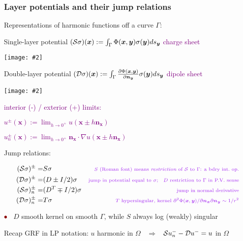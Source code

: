\documentclass[t]{beamer}
\newcommand{\ft}[1]{\frametitle{#1}}
\newcommand{\bea}{\begin{eqnarray}}
\newcommand{\eea}{\end{eqnarray}}
\newcommand{\mbf}[1]{{\bm #1}}           %
\newcommand{\com}[1]{{\scriptsize \textcolor{purple}{#1}}}      %
\newcommand{\sg}{\vspace{1ex}}
\newcommand{\rb}{\ensuremath{\textcolor{darkred}{\bullet\;}}\ }
\newcommand{\bmp}[1]{\begin{minipage}{#1}}
\newcommand{\emp}{\end{minipage}}
\newcommand{\pig}[2]{\bmp{#1}\texttt{[image: \#2]}\emp} %
\newcommand{\xx}{\mbf{x}}
\newcommand{\yy}{\mbf{y}}
\newcommand{\nn}{\mbf{n}}
\newcommand{\Srep}{{\cal S}}
\newcommand{\Drep}{{\cal D}}
\begin{document}
\begin{noframe}\ft{Layer potentials and their jump relations}


  \bmp{4in}
  Representations of harmonic functions off a curve $\Gamma$:
\;\com{``density'' $\sigma$}
  
  \sg

  Single-layer potential
  $(\Srep\sigma)(\xx) := \int_\Gamma \Phi(\xx,\yy) \sigma(\yy) ds_\yy$
  \;
    \com{charge sheet}
  \emp
\hfill \pig{.6in}{slp_lap}

  \bmp{4in}
  Double-layer potential
$(\Drep\sigma)(\xx) := \int_\Gamma \frac{\partial \Phi(\xx,\yy)}{\partial \nn_\yy}
  \sigma(\yy) ds_\yy$
  \com{dipole sheet}

  \vspace{4ex}

  \mbox{}
  \emp
\hfill \pig{.6in}{dlp_lap}

\vspace{-4ex}
\pause

\bmp{1.9in}
\com{interior (-) / exterior (+) limits:}
\emp
\bmp{2.5in}
\com{
  $u^{\pm}(\xx) := \lim_{h\to 0^+} u(\xx \pm h\nn_\xx)$    \quad 
}

\com{
  $u_n^{\pm}(\xx) := \lim_{h\to 0^+} \nn_\xx \cdot \nabla u(\xx \pm h\nn_\xx)$
 }
\emp

{\large Jump relations:}

\vspace{-5ex}

\bea
(\Srep\sigma)^\pm =&  S\sigma
 & \mbox{\com{$S$ (Roman font) means {\em restriction} of $\Srep$ to $\Gamma$: a bdry int.\ op.}}
\nonumber\\
(\Drep\sigma)^\pm =&  (D\pm I/2) \sigma
& \mbox{\com{jump in potential equal to $\sigma$; \; $D$ restriction to $\Gamma$ in P.V. sense}}
\nonumber \\
(\Srep\sigma)_n^\pm =&  (D^T\mp I/2) \sigma
& \mbox{\com{jump in normal derivative}} %
\nonumber \\
(\Drep\sigma)_n^\pm =&  T \sigma
& \mbox{\com{$T$ hypersingular, kernel $\partial^2 \Phi(\xx,\yy) / \partial \nn_\xx \partial \nn_\yy \sim 1/r^2$}}
\nonumber
\eea

\vspace{-1ex}

\rb $D$ smooth kernel on smooth $\Gamma$, while $S$ always log (weakly) singular



\sg
\pause

Recap GRF in LP notation:
\hfill $u$ harmonic in $\Omega$
$\;\;\Rightarrow\;\;$
$\Srep u_n^- - \Drep u^- = u$ in $\Omega$




\end{noframe}
\end{document}
